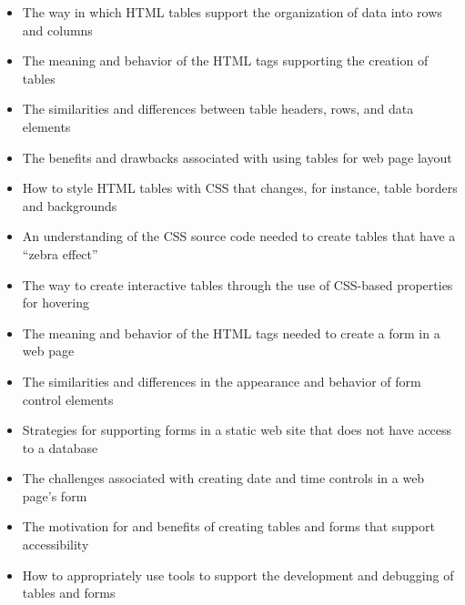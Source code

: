 \documentclass[11pt]{article}
\begin{document}
\begin{itemize}

  \itemsep 0in

  \item The way in which HTML tables support the organization of data into rows
    and columns
  \item The meaning and behavior of the HTML tags supporting the creation of 
    tables
  \item The similarities and differences between table headers, rows, and data
    elements
  \item The benefits and drawbacks associated with using tables for web page
    layout
  \item How to style HTML tables with CSS that changes, for instance, table
    borders and backgrounds
  \item An understanding of the CSS source code needed to create tables that
    have a ``zebra effect''
  \item The way to create interactive tables through the use of CSS-based
    properties for hovering
  \item The meaning and behavior of the HTML tags needed to create a form in a
    web page
  \item The similarities and differences in the appearance and behavior of form
    control elements
  \item Strategies for supporting forms in a static web site that does not have
    access to a database
  \item The challenges associated with creating date and time controls in a web
    page's form
  \item The motivation for and benefits of creating tables and forms that
    support accessibility
  \item How to appropriately use tools to support the development and
    debugging of tables and forms

\end{itemize}
\end{document}
